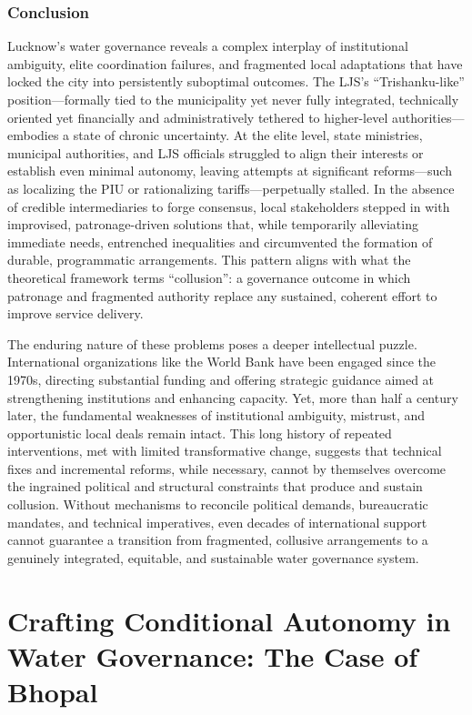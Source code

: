 \subsubsection{Conclusion}

Lucknow’s water governance reveals a complex interplay of institutional ambiguity, elite coordination failures, and fragmented local adaptations that have locked the city into persistently suboptimal outcomes. The LJS’s “Trishanku-like” position—formally tied to the municipality yet never fully integrated, technically oriented yet financially and administratively tethered to higher-level authorities—embodies a state of chronic uncertainty. At the elite level, state ministries, municipal authorities, and LJS officials struggled to align their interests or establish even minimal autonomy, leaving attempts at significant reforms—such as localizing the PIU or rationalizing tariffs—perpetually stalled. In the absence of credible intermediaries to forge consensus, local stakeholders stepped in with improvised, patronage-driven solutions that, while temporarily alleviating immediate needs, entrenched inequalities and circumvented the formation of durable, programmatic arrangements. This pattern aligns with what the theoretical framework terms “collusion”: a governance outcome in which patronage and fragmented authority replace any sustained, coherent effort to improve service delivery.

The enduring nature of these problems poses a deeper intellectual puzzle. International organizations like the World Bank have been engaged since the 1970s, directing substantial funding and offering strategic guidance aimed at strengthening institutions and enhancing capacity. Yet, more than half a century later, the fundamental weaknesses of institutional ambiguity, mistrust, and opportunistic local deals remain intact. This long history of repeated interventions, met with limited transformative change, suggests that technical fixes and incremental reforms, while necessary, cannot by themselves overcome the ingrained political and structural constraints that produce and sustain collusion. Without mechanisms to reconcile political demands, bureaucratic mandates, and technical imperatives, even decades of international support cannot guarantee a transition from fragmented, collusive arrangements to a genuinely integrated, equitable, and sustainable water governance system.

\section{Crafting Conditional Autonomy in Water Governance: The Case of Bhopal}

